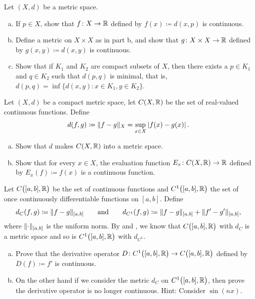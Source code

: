 \begin{samepage}
\begin{exercise}
Let $(X,d)$ be a metric space.
\begin{enumerate}[a)]
\item
If $p \in X$,
show that $f \colon X \to {\mathbb{R}}$ defined
by $f(x) \coloneqq d(x,p)$ is continuous.
\item
Define a metric on $X \times X$ as in  part
b, and show that $g \colon X \times X \to {\mathbb{R}}$ defined by
$g(x,y) \coloneqq d(x,y)$ is continuous.
\item
Show that if $K_1$ and $K_2$ are compact subsets of $X$, then
there exists a $p \in K_1$ and $q \in K_2$ such that $d(p,q)$ is minimal,
that is, $d(p,q) = \inf \{ d(x,y) \colon x \in K_1, y \in K_2 \}$.
\end{enumerate}
\end{exercise}
\end{samepage}

\begin{exercise}
Let $(X,d)$ be a compact metric space, let $C(X,{\mathbb{R}})$ be the set
of real-valued continuous functions.  Define
\begin{equation*}
d(f,g) \coloneqq \lVert {f-g} \rVert_X = \sup_{x \in X} \left\lvert {f(x)-g(x)} \right\rvert .
\end{equation*}
\begin{enumerate}[a)]
\item
Show that $d$ makes $C(X,{\mathbb{R}})$ into a metric space.
\item
Show that for every $x \in X$, the evaluation function
$E_x \colon C(X,{\mathbb{R}}) \to {\mathbb{R}}$ defined by $E_x(f) \coloneqq f(x)$
is a continuous function.
\end{enumerate}
\end{exercise}

\begin{samepage}
\begin{exercise}
Let $C\bigl([a,b],{\mathbb{R}}\bigr)$ be the set of continuous functions and
$C^1\bigl([a,b],{\mathbb{R}}\bigr)$ the set of
once continuously differentiable functions on $[a,b]$.
Define
\begin{equation*}
d_{C}(f,g) \coloneqq \lVert {f-g} \rVert_{[a,b]}
\qquad \text{and} \qquad
d_{C^1}(f,g) \coloneqq \lVert {f-g} \rVert_{[a,b]} + \lVert {f'-g'} \rVert_{[a,b]},
\end{equation*}
where $\lVert {\cdot} \rVert_{[a,b]}$ is the uniform norm.
By  and , we know that
$C\bigl([a,b],{\mathbb{R}}\bigr)$ with $d_C$ is a metric space and
so is
$C^1\bigl([a,b],{\mathbb{R}}\bigr)$ with $d_{C^1}$.
\begin{enumerate}[a)]
\item
Prove that the derivative operator $D \colon 
C^1\bigl([a,b],{\mathbb{R}}\bigr) \to C\bigl([a,b],{\mathbb{R}}\bigr)$ defined by
$D(f) \coloneqq f'$ is continuous.
\item
On the other hand if we consider the metric $d_C$ on $C^1\bigl([a,b],{\mathbb{R}}\bigr)$,
then prove the derivative operator is no longer continuous.  Hint: Consider
$\sin(n x)$.
\end{enumerate}
\end{exercise}
\end{samepage}

